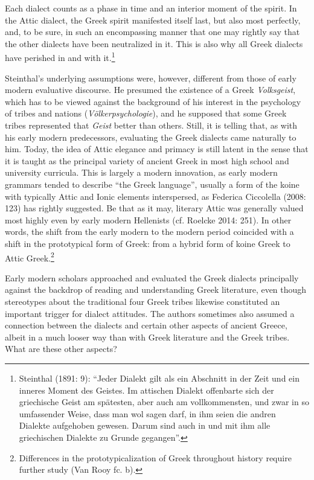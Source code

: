 \begin{styleQuote}
Each dialect counts as a phase in time and an interior moment of the spirit. In the Attic dialect, the Greek spirit manifested itself last, but also most perfectly, and, to be sure, in such an encompassing manner that one may rightly say that the other dialects have been neutralized in it. This is also why all Greek dialects have perished in and with it.\footnote{ Steinthal (1891: 9): “Jeder Dialekt gilt als ein Abschnitt in der Zeit und ein inneres Moment des Geistes. Im attischen Dialekt offenbarte sich der griechische Geist am spätesten, aber auch am vollkommensten, und zwar in so umfassender Weise, dass man wol sagen darf, in ihm seien die andren Dialekte aufgehoben gewesen. Darum sind auch in und mit ihm alle griechischen Dialekte zu Grunde gegangen”.}
\end{styleQuote}

\begin{styleStandard}
Steinthal’s underlying assumptions were, however, different from those of early modern evaluative discourse. He presumed the existence of a Greek \textit{Volksgeist}, which has to be viewed against the background of his interest in the psychology of tribes and nations (\textit{Völkerpsychologie}), and he supposed that some Greek tribes represented that \textit{Geist} better than others. Still, it is telling that, as with his early modern predecessors, evaluating the Greek dialects came naturally to him. Today, the idea of Attic elegance and primacy is still latent in the sense that it is taught as the principal variety of ancient Greek in most high school and university curricula. This is largely a modern innovation, as early modern grammars tended to describe “the Greek language”, usually a form of the koine with typically Attic and Ionic elements interspersed, as Federica Ciccolella (2008: 123) has rightly suggested. Be that as it may, literary Attic was generally valued most highly even by early modern Hellenists (cf. Roelcke 2014: 251). In other words, the shift from the early modern to the modern period coincided with a shift in the prototypical form of Greek: from a hybrid form of koine Greek to Attic Greek.\footnote{ Differences in the prototypicalization of Greek throughout history require further study (Van Rooy fc. b).}
\end{styleStandard}

\begin{styleStandard}
Early modern scholars approached and evaluated the Greek dialects principally against the backdrop of reading and understanding Greek literature, even though stereotypes about the traditional four Greek tribes likewise constituted an important trigger for dialect attitudes. The authors sometimes also assumed a connection between the dialects and certain other aspects of ancient Greece, albeit in a much looser way than with Greek literature and the Greek tribes. What are these other aspects?
\end{styleStandard}

